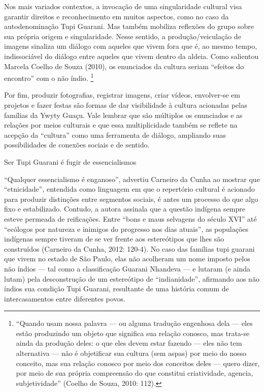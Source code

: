 \documentclass{article}
\begin{document}
Nos mais variados contextos, a invoca\c{c}\~ao de uma singularidade
cultural visa garantir direitos e reconhecimento em muitos aspectos,
como no caso da autodenomina\c{c}\~ao Tupi Guarani. Mas tamb\'em
mobiliza reflex\~oes do grupo sobre sua pr\'opria origem e
singularidade. Nesse sentido, a produ\c{c}\~ao/veicula\c{c}\~ao de
imagens sinaliza um di\'alogo com aqueles que vivem fora que \'e, ao
mesmo tempo, indissoci\'avel do di\'alogo entre aqueles que vivem
dentro da aldeia. Como salientou Marcela Coelho de Souza (2010), os
enunciados da cultura seriam {\textquotedblleft}efeitos do
encontro{\textquotedblright} com o n\~ao \'indio. \footnote{
{\textquotedblleft}Quando usam nossa palavra --- ou alguma
tradu\c{c}\~ao engenhosa dela --- eles est\~ao produzindo um objeto que
significa sua rela\c{c}\~ao conosco, mas trata-se ainda da
produ\c{c}\~ao deles: o que eles devem estar fazendo --- eles n\~ao tem
alternativa --- n\~ao \'e objetificar sua cultura (sem aspas) por meio
do nosso conceito, mas sua rela\c{c}\~ao conosco por meio dos conceitos
deles --- quero dizer, por meio de sua pr\'opria compreens\~ao do que
constitui criatividade, agencia, subjetividade{\textquotedblright}
(Coelho de Souza, 2010: 112).}

Por fim, produzir fotografias, registrar imagens, criar v\'ideos,
envolver-se em projetos e fazer festas s\~ao formas de dar visibilidade
\`a cultura acionadas pelas fam\'ilias da Ywyty Gua\c{c}u. Vale lembrar
que s\~ao m\'ultiplos os enunciados e as rela\c{c}\~oes por meios
culturais e que essa multiplicidade tamb\'em se reflete na
acep\c{c}\~ao da {\textquotedblleft}cultura{\textquotedblright} como
uma ferramenta de di\'alogo, ampliando suas possibilidades de
conex\~oes sociais e de sentido.

Ser Tupi Guarani \'e fugir de essencialismos

{\textquotedblleft}Qualquer essencialismo \'e
enganoso{\textquotedblright}, advertiu Carneiro da Cunha ao mostrar que
{\textquotedblleft}etnicidade{\textquotedblright}, entendida como
linguagem em que o repert\'orio cultural \'e acionado para produzir
distin\c{c}\~oes entre segmentos sociais, \'e antes um processo do que
algo fixo e estabilizado. Contudo, a autora assinala que a quest\~ao
ind\'igena sempre esteve permeada de reifica\c{c}\~oes. Entre
{\textquotedblleft}bons e maus selvagens do s\'eculo
XVI{\textquotedblright} at\'e {\textquotedblleft}ec\'ologos por
natureza e inimigos do progresso nos dias atuais{\textquotedblright},
as popula\c{c}\~oes ind\'igenas sempre tiveram de se ver frente aos
estere\'otipos que lhes s\~ao constru\'idos (Carneiro da Cunha, 2012:
120-4). No caso das fam\'ilias tupi guarani que vivem no estado de
S\~ao Paulo, elas n\~ao acolheram um nome imposto pelos n\~ao \'indios
--- tal como a classifica\c{c}\~ao Guarani Nhandeva --- e lutaram (e
ainda lutam) pela desconstru\c{c}\~ao de um estere\'otipo de
{\textquotedblleft}indianidade{\textquotedblright}, afirmando aos n\~ao
\'indios sua condi\c{c}\~ao Tupi Guarani, resultante de uma hist\'oria
comum de intercasamentos entre diferentes povos. 
\end{document}
